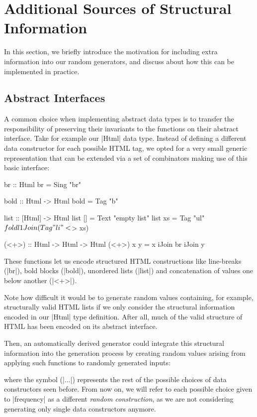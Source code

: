\section{Additional Sources of Structural Information}
\label{sec:sources}

In this section, we briefly introduce the motivation for including extra
information into our random generators, and discuss about how this can be
implemented in practice.


%
\subsection{Abstract Interfaces}

A common choice when implementing abstract data types is to transfer the
responsibility of preserving their invariants to the functions on their abstract
interface.
%
Take for example our |Html| data type.
%
Instead of defining a different data constructor for each possible HTML tag, we
opted for a very small generic representation that can be extended via a set of
combinators making use of this basic interface:

\begin{code}
br :: Html
br = Sing "br"

bold :: Html -> Html
bold = Tag "b"

list :: [Html] -> Html
list []  = Text "empty list"
list xs  = Tag "ul" $ foldl1 Join (Tag "li" <$> xs)

(<+>) :: Html -> Html -> Html
(<+>) x y = x iJoin br iJoin y
\end{code} %
%
These functions let us encode structured HTML constructions like line-breaks
(|br|), bold blocks (|bold|), unordered lists (|list|) and concatenation of
values one below another (|<+>|).
%

Note how difficult it would be to generate random values containing, for
example, structurally valid HTML lists if we only consider the structural
information encoded in our |Html| type definition.
%
After all, much of the valid structure of HTML has been encoded on its abstract
interface.


Then, an automatically derived generator could integrate this structural
information into the generation process by creating random values arising from
applying such functions to randomly generated inputs:

%
where the symbol (|...|) represents the rest of the possible choices of data
constructors seen before.
%
From now on, we will refer to each possible choice given to |frequency| as a
different \emph{random construction}, as we are not considering generating only
single data constructors anymore.



